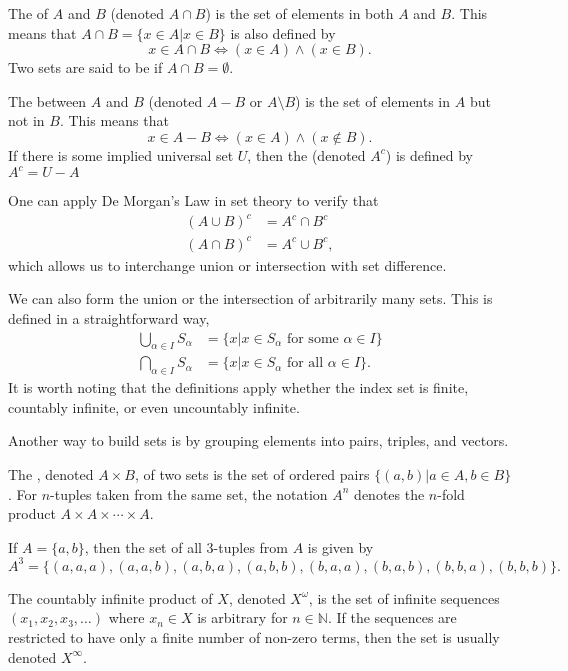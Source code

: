 \begin{definition}
The  of $A$ and $B$ (denoted $A\cap B$) is the set of elements in both $A$ and $B$.
This means that $A\cap B = \{x\in A | x\in B \}$ is also defined by
\[ x\in A\cap B \Leftrightarrow (x\in A)\wedge (x\in B). \]
Two sets are said to be  if $A\cap B = \emptyset$.
\end{definition}

\begin{definition}
The  between $A$ and $B$ (denoted $A-B$ or $A \setminus \!B$) is the set of elements in $A$ but not in $B$.
This means that
\[ x\in A-B \Leftrightarrow (x\in A)\wedge (x\notin B). \]
If there is some implied universal set $U$, then the  (denoted $A^c$) is defined by $A^c = U-A$
\end{definition}

One can apply De Morgan's Law in set theory to verify that
\begin{align*}
(A \cup B)^c & = A^c \cap B^c \\
(A \cap B)^c & = A^c \cup B^c,
\end{align*}
which allows us to interchange union or intersection with set difference.

We can also form the union or the intersection of arbitrarily many sets.
This is defined in a straightforward way,
\begin{align*}
\bigcup_{\alpha \in I} S_{\alpha}
&= \{ x | x \in S_{\alpha} \text{ for some } \alpha \in I \} \\
\bigcap_{\alpha \in I} S_{\alpha}
&= \{ x | x \in S_{\alpha} \text{ for all } \alpha \in I \} .
\end{align*}
It is worth noting that the definitions apply whether the index set is finite, countably infinite, or even uncountably infinite.

Another way to build sets is by grouping elements into pairs, triples, and vectors.
\begin{definition}
The , denoted $A\times B$, of two sets is the set of ordered pairs $\{(a,b) | a\in A, b\in B\}$.
For $n$-tuples taken from the same set, the notation $A^n$ denotes the $n$-fold product $A\times A \times \cdots \times A$.
\end{definition}
\begin{example}
If $A  = \{ a,b \}$, then the set of all 3-tuples from $A$ is given by 
\begin{equation*}
A^3 = \{ (a,a,a),(a,a,b),(a,b,a),(a,b,b),(b,a,a),(b,a,b),(b,b,a),(b,b,b) \}.
\end{equation*}
\end{example}
The countably infinite product of $X$, denoted $X^\omega$, is the set of infinite sequences $(x_1,x_2,x_3,\ldots)$ where $x_n \in X$ is arbitrary for $n\in \mathbb{N}$.
If the sequences are restricted to have only a finite number of non-zero terms, then the set is usually denoted $X^\infty$.

